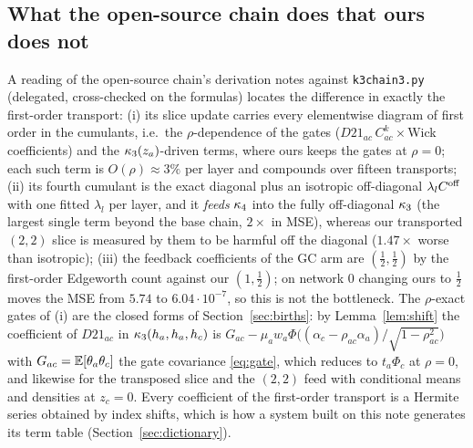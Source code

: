 \subsection{What the open-source chain does that ours does not}
A reading of the open-source chain's derivation notes against \texttt{k3chain3.py} (delegated, cross-checked on
the formulas) locates the difference in exactly the first-order transport: (i) its slice update carries every
elementwise diagram of first order in the cumulants, i.e.\ the $\rho$-dependence of the gates
($D21_{ac}\,C_{ac}^k\times$Wick coefficients) and the $\kappa_3(z_a)$-driven terms, where ours keeps the gates at
$\rho=0$; each such term is $O(\rho)\approx3\%$ per layer and compounds over fifteen transports; (ii) its fourth
cumulant is the exact diagonal plus an isotropic off-diagonal $\lambda_lC^{\rm off}$ with one fitted $\lambda_l$ per
layer, and it \emph{feeds} $\kappa_4$ into the fully off-diagonal $\kappa_3$ (the largest single term beyond the base
chain, $2\times$ in MSE), whereas our transported $(2,2)$ slice is measured by them to be harmful off the
diagonal ($1.47\times$ worse than isotropic); (iii) the feedback coefficients of the GC arm are
$(\tfrac12,\tfrac12)$ by the first-order Edgeworth count against our $(1,\tfrac12)$; on network $0$ changing
ours to $\tfrac12$ moves the MSE from $5.74$ to $6.04\cdot10^{-7}$, so this is not the bottleneck. The
$\rho$-exact gates of (i) are the closed forms of Section~\ref{sec:births}: by Lemma~\ref{lem:shift} the
coefficient of $D21_{ac}$ in $\kappa_3(h_a,h_a,h_c)$ is $G_{ac}-\mu_aw_a\Phi\big((\alpha_c-\rho_{ac}\alpha_a)/\sqrt{1-\rho_{ac}^2}\big)$
with $G_{ac}=\mathbb E[\theta_a\theta_c]$ the gate covariance \eqref{eq:gate}, which reduces to $t_a\Phi_c$ at $\rho=0$,
and likewise for the transposed slice and the $(2,2)$ feed with conditional means and densities at $z_c=0$.
Every coefficient of the first-order transport is a Hermite series obtained by index shifts, which is how a
system built on this note generates its term table (Section~\ref{sec:dictionary}).
